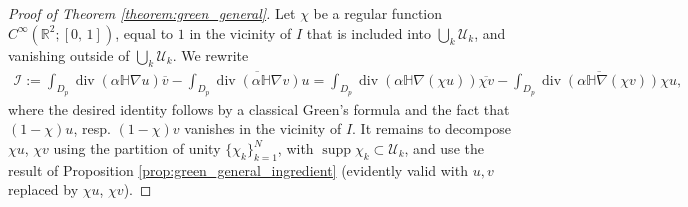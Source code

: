 \documentclass[report]{elsarticle}
\numberwithin{theorem}{section}
\begin{document}
\begin{proof}[Proof of Theorem \ref{theorem:green_general}] 
Let $\chi$ be a regular function $C^{\infty}(\mathbb{R}^2; [0,\,1])$,  equal to $1$ in the vicinity of $I$ that is included into $\bigcup\limits_k\mathcal{U}_k$, and vanishing outside of $\bigcup\limits_{k}\mathcal{U}_k$. We rewrite 
\begin{align*}
\mathcal{I}:=	\int_{D_p}\operatorname{div}(\alpha\mathbb{H}\nabla u)\overline{v}-	\int_{D_p}\overline{\operatorname{div}(\alpha\mathbb{H}\nabla v)}{u}=	\int_{D_p}\operatorname{div}(\alpha\mathbb{H}\nabla (\chi u))\overline{\chi v}-	\int_{D_p}\overline{\operatorname{div}(\alpha\mathbb{H}\nabla(\chi v))}{\chi u}, 
\end{align*}
where the desired identity follows by a classical Green's formula and the fact that $(1-\chi)u$, resp. $(1-\chi)v$ vanishes in the vicinity of $I$. It remains to decompose $\chi u$, $\chi v$ using the partition of unity $\{\chi_k\}_{k=1}^N$, with $\operatorname{supp}\chi_k\subset \mathcal{U}_k$, and use the result of Proposition \ref{prop:green_general_ingredient} (evidently valid with $u,v$ replaced by $\chi u$, $\chi v$).
\end{proof}
\end{document}
